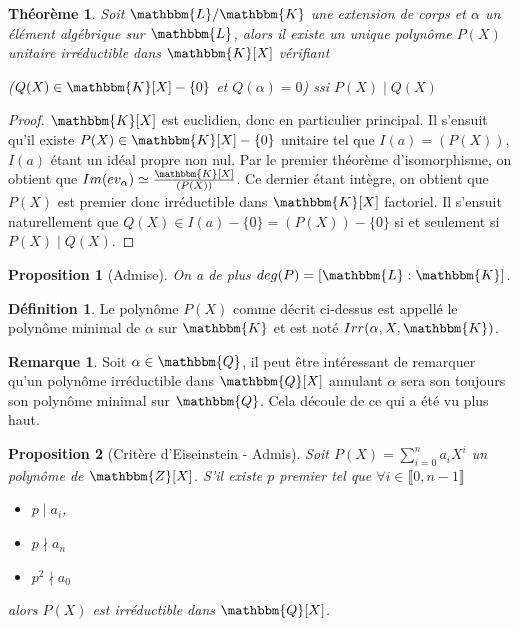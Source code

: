 \documentclass[12pt]{article}
\newcommand{\jL}{\mathbbm{L}}
\newcommand{\Z}{\mathbbm{Z}}
\newcommand{\Q}{\mathbbm{Q}}
\newcommand{\K}{\mathbbm{K}}
\newtheorem{prop}{Proposition}
\newtheorem{thm}{Théorème}
\theoremstyle{definition}\newtheorem{defn}{Définition}
\theoremstyle{definition}\newtheorem{exm}{Exemple}
\theoremstyle{definition}\newtheorem{rem}{Remarque}
\theoremstyle{definition}\newtheorem{algo}{Algorithme}
\theoremstyle{remark}\newtheorem{exo}{Exercice}
\theoremstyle{remark}\newtheorem{nota}{Notation}
\begin{document}
\begin{thm}
Soit $\jL / \K$ une extension de corps et $\alpha$ un élément algébrique sur $\jL$, alors il existe un unique polynôme $P(X)$ unitaire irréductible dans $\K[X]$ vérifiant
\begin{center} ($Q(X) \in \K[X] - \{0\}$ et $Q(\alpha)=0$) ssi $P(X) \mid Q(X)$\end{center}
\end{thm}

\enlargethispage{2\baselineskip}

\begin{proof}
$\K[X]$ est euclidien, donc en particulier principal. Il s'ensuit qu'il existe $P(X) \in \K[X] - \{0\}$ unitaire tel que $I(a) = (P(X))$, $I(a)$ étant un idéal propre non nul. Par le premier théorème d'isomorphisme, on obtient que $Im(ev_\alpha) \simeq \frac{\K[X]}{(P(X))}$. \newline
Ce dernier étant intègre, on obtient que $P(X)$ est premier donc irréductible dans $\K[X]$ factoriel. \newline
Il s'ensuit naturellement que $Q(X) \in I(a) - \{0\} = (P(X)) - \{0\}$ si et seulement si $P(X) \mid Q(X)$.
\end{proof}

\begin{prop}[Admise]
On a de plus $deg(P) = [\jL : \K]$.
\end{prop}

\begin{defn}
Le polynôme $P(X)$ comme décrit ci-dessus est appellé le polynôme minimal de $\alpha$ sur $\K$ et est noté $Irr(\alpha,X,\K)$.
\end{defn}

\begin{rem}
Soit $\alpha \in \Q$, il peut être intéressant de remarquer qu'un polynôme irréductible dans $\Q[X]$ annulant $\alpha$ sera son toujours son polynôme minimal sur $\Q$. Cela découle de ce qui a été vu plus haut.
\end{rem}

\begin{prop}[Critère d'Eiseinstein - Admis]
Soit $P(X) = \displaystyle \sum_{i=0}^{n}a_iX^i$ un polynôme de $\Z[X]$. S'il existe $p$ premier tel que $\forall i \in \llbracket 0, n-1 \rrbracket$
\begin{itemize}
	\item $p \mid a_i$, 
	\item $p \nmid a_n$
	\item $p^2 \nmid a_0$
\end{itemize}
alors $P(X)$ est irréductible dans $\Q[X]$.
\end{prop}
\end{document}
